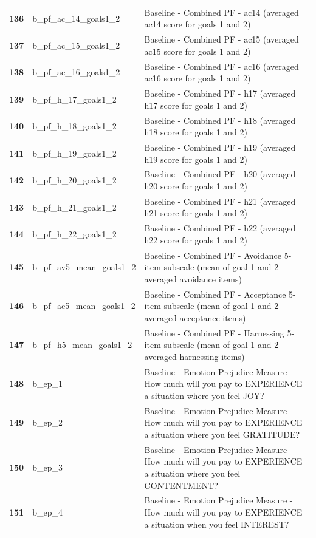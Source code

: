 \documentclass[
  letterpaper,
  DIV=11,
  numbers=noendperiod]{scrartcl}
\begin{document}
\begin{longtable}[t]{>{}cll}
\addlinespace
\textbf{136} & b\_pf\_ac\_14\_goals1\_2 & Baseline - Combined PF - ac14 (averaged ac14 score for goals 1 and 2)\\
\textbf{137} & b\_pf\_ac\_15\_goals1\_2 & Baseline - Combined PF - ac15 (averaged ac15 score for goals 1 and 2)\\
\textbf{138} & b\_pf\_ac\_16\_goals1\_2 & Baseline - Combined PF - ac16 (averaged ac16 score for goals 1 and 2)\\
\textbf{139} & b\_pf\_h\_17\_goals1\_2 & Baseline - Combined PF - h17 (averaged h17 score for goals 1 and 2)\\
\textbf{140} & b\_pf\_h\_18\_goals1\_2 & Baseline - Combined PF - h18 (averaged h18 score for goals 1 and 2)\\
\addlinespace
\textbf{141} & b\_pf\_h\_19\_goals1\_2 & Baseline - Combined PF - h19 (averaged h19 score for goals 1 and 2)\\
\textbf{142} & b\_pf\_h\_20\_goals1\_2 & Baseline - Combined PF - h20 (averaged h20 score for goals 1 and 2)\\
\textbf{143} & b\_pf\_h\_21\_goals1\_2 & Baseline - Combined PF - h21 (averaged h21 score for goals 1 and 2)\\
\textbf{144} & b\_pf\_h\_22\_goals1\_2 & Baseline - Combined PF - h22 (averaged h22 score for goals 1 and 2)\\
\textbf{145} & b\_pf\_av5\_mean\_goals1\_2 & Baseline - Combined PF - Avoidance 5-item subscale (mean of goal 1 and 2 averaged avoidance items)\\
\addlinespace
\textbf{146} & b\_pf\_ac5\_mean\_goals1\_2 & Baseline - Combined PF - Acceptance 5-item subscale (mean of goal 1 and 2 averaged acceptance items)\\
\textbf{147} & b\_pf\_h5\_mean\_goals1\_2 & Baseline - Combined PF - Harnessing 5-item subscale (mean of goal 1 and 2 averaged harnessing items)\\
\textbf{148} & b\_ep\_1 & Baseline - Emotion Prejudice Measure - How much will you pay to EXPERIENCE a situation where you feel JOY?\\
\textbf{149} & b\_ep\_2 & Baseline - Emotion Prejudice Measure - How much will you pay to EXPERIENCE a situation where you feel GRATITUDE?\\
\textbf{150} & b\_ep\_3 & Baseline - Emotion Prejudice Measure - How much will you pay to EXPERIENCE a situation where you feel CONTENTMENT?\\
\addlinespace
\textbf{151} & b\_ep\_4 & Baseline - Emotion Prejudice Measure - How much will you pay to EXPERIENCE a situation when you feel INTEREST?\\

\end{longtable}
\end{document}
